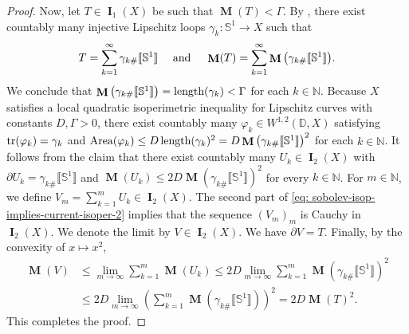 \documentclass{amsart}
\numberwithin{equation}{section}
\newcommand{\N}{\mathbb{N}}
\DeclareMathOperator{\bI}{\mathbf{I}}
\DeclareMathOperator{\bM}{\mathbf{M}}
\DeclareMathOperator{\len}{\textup{length}}
\DeclareMathOperator{\trace}{\textup{tr}}
\DeclareMathOperator{\area}{\textup{Area}}
\newcommand{\bb}[1]{\llbracket #1\rrbracket}
\begin{document}
\begin{proof}
            Now, let $T \in \bI_1(X)$ be such that $\bM(T) <\Gamma$. By \cite[Theorem 5.3]{Enrico-Decomposition}, there exist countably many injective Lipschitz loops $\gamma_k \colon \mathbb{S}^1 \to X$ such that
            \begin{equation}\label{eq: sobolev-isop-implies-current-isoper-2}
               T = \sum_{k=1}^\infty \gamma_{k\#}\bb{\mathbb{S}^1} \quad\textup{ and }\quad \bM(T) = \sum_{k=1}^\infty \bM\big(\gamma_{k\#}\bb{\mathbb{S}^1}\big). 
            \end{equation}
            We conclude that $\bM\big(\gamma_{k\#}\bb{\mathbb{S}^1}\big)= \len(\gamma_k) < \Gamma$ for each $k \in \N$. Because $X$ satisfies a local quadratic isoperimetric inequality for Lipschitz curves with constants $D,\Gamma >0$, there exist countably many $\varphi_k \in W^{1,2}(\mathbb{D},X)$ satisfying $\trace(\varphi_k) = \gamma_k$ and $\area(\varphi_k) \leq D \len(\gamma_k)^2 = D\bM\big(\gamma_{k\#}\bb{\mathbb{S}^1}\big)^2$ for each $k \in \N$. It follows from the claim that there exist countably many $U_k\in \bI_2(X)$ with $\partial U_k = \gamma_{k\#}\bb{\mathbb{S}^1}$ and $\bM(U_k)\leq 2D \bM(\gamma_{k\#}\bb{\mathbb{S}^1})^2$ for every $k \in \N$. For $m \in \N$, we define $V_m = \sum_{k=1}^m U_k \in \bI_2(X)$. The second part of \eqref{eq: sobolev-isop-implies-current-isoper-2} implies that the sequence $(V_m)_m$ is Cauchy in $\bI_2(X)$. We denote the limit by $V \in \bI_2(X)$. We have $\partial V = T$. Finally, by the convexity of $x \mapsto x^2$, 
            \begin{align*}
                \bM(V) &\leq \lim_{m\to \infty} \sum_{k=1}^m \bM(U_k) \leq 2 D \lim_{m\to \infty} \sum_{k=1}^m \bM(\gamma_{k\#}\bb{\mathbb{S}^1})^2
                \\
                &\leq 2 D \lim_{m\to \infty} \left(\sum_{k=1}^m \bM(\gamma_{k\#}\bb{\mathbb{S}^1})\right)^2 = 2 D \bM(T)^2.
            \end{align*}
            This completes the proof. 
        \end{proof}
      
\end{document}
